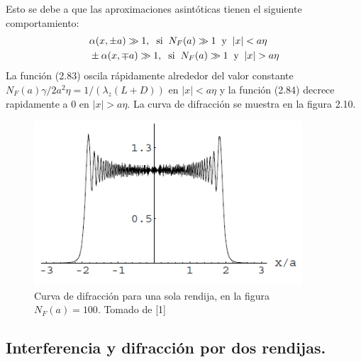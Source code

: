 Esto se debe a que las aproximaciones asintóticas tienen el siguiente comportamiento:
\begin{eqnarray}
&\alpha(x,\pm a)\gg 1,\hspace{0.2cm} \text{si}\hspace{0.2cm} N_F(a)\gg 1 \hspace{0.2cm} \text{y}\hspace{0.2cm} |x|<a\eta\\
&\pm\alpha(x,\mp a)\gg 1,\hspace{0.2cm} \text{si}\hspace{0.2cm} N_F(a)\gg 1 \hspace{0.2cm} \text{y}\hspace{0.2cm} |x|>a\eta
\end{eqnarray}
La función (2.83) oscila rápidamente alrededor del valor constante $N_F(a)\gamma/2a^2\eta=1/(\lambda_z(L+D))$ en $|x|<a\eta$ y la función (2.84) decrece rapidamente a 0 en $|x|>a\eta$. La curva de difracción se muestra en la figura 2.10.
\begin{figure}[h!]
\centering
\includegraphics[width=10cm]{Imagenes/Fig10}
\caption[Patrón de interferencia, 1 rendija, regimen de Fressnel]{Curva de difracción para una sola rendija, en la figura  $N_F(a)=100$. Tomado de [1]}
\end{figure}



\subsection{Interferencia y difracción por dos rendijas.}

